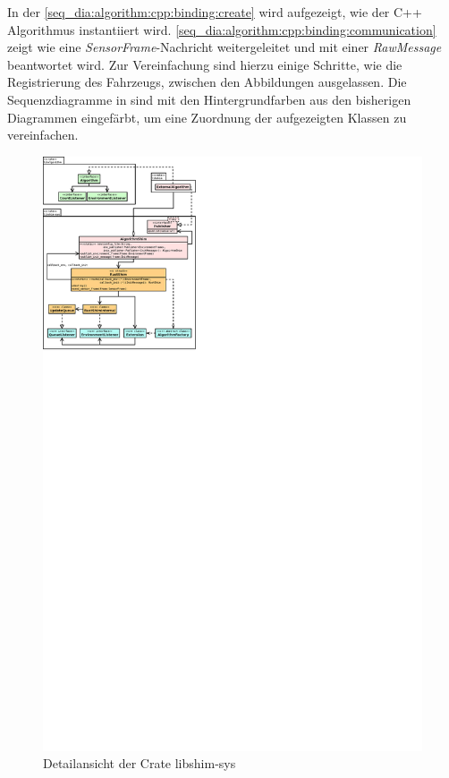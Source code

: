 In der \autoref{seq_dia:algorithm:cpp:binding:create} wird aufgezeigt, wie der C++ Algorithmus instantiiert wird.
\autoref{seq_dia:algorithm:cpp:binding:communication} zeigt wie eine \textit{SensorFrame}-Nachricht weitergeleitet und mit einer \textit{RawMessage} beantwortet wird.
Zur Vereinfachung sind hierzu einige Schritte, wie die Registrierung des Fahrzeugs, zwischen den Abbildungen ausgelassen.
Die Sequenzdiagramme in sind mit den Hintergrundfarben aus den bisherigen Diagrammen eingefärbt, um eine Zuordnung der aufgezeigten Klassen zu vereinfachen.

\begin{figure}[H]
	\centering
	\includegraphics[width=2.5\textwidth]{dia/libshim}
	\caption{Detailansicht der Crate libshim-sys}
	\label{draft:libshim}
\end{figure}


